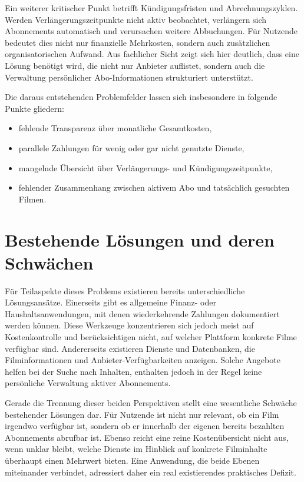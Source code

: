 Ein weiterer kritischer Punkt betrifft Kündigungsfristen und Abrechnungszyklen. Werden Verlängerungszeitpunkte nicht aktiv beobachtet, verlängern sich Abonnements automatisch und verursachen weitere Abbuchungen. Für Nutzende bedeutet dies nicht nur finanzielle Mehrkosten, sondern auch zusätzlichen organisatorischen Aufwand. Aus fachlicher Sicht zeigt sich hier deutlich, dass eine Lösung benötigt wird, die nicht nur Anbieter auflistet, sondern auch die Verwaltung persönlicher Abo-Informationen strukturiert unterstützt.

Die daraus entstehenden Problemfelder lassen sich insbesondere in folgende Punkte gliedern:
\begin{itemize}
    \item fehlende Transparenz über monatliche Gesamtkosten,
    \item parallele Zahlungen für wenig oder gar nicht genutzte Dienste,
    \item mangelnde Übersicht über Verlängerungs- und Kündigungszeitpunkte,
    \item fehlender Zusammenhang zwischen aktivem Abo und tatsächlich gesuchten Filmen.
\end{itemize}

\section{Bestehende Lösungen und deren Schwächen}
Für Teilaspekte dieses Problems existieren bereits unterschiedliche Lösungsansätze. Einerseits gibt es allgemeine Finanz- oder Haushaltsanwendungen, mit denen wiederkehrende Zahlungen dokumentiert werden können. Diese Werkzeuge konzentrieren sich jedoch meist auf Kostenkontrolle und berücksichtigen nicht, auf welcher Plattform konkrete Filme verfügbar sind. Andererseits existieren Dienste und Datenbanken, die Filminformationen und Anbieter-Verfügbarkeiten anzeigen. Solche Angebote helfen bei der Suche nach Inhalten, enthalten jedoch in der Regel keine persönliche Verwaltung aktiver Abonnements.

Gerade die Trennung dieser beiden Perspektiven stellt eine wesentliche Schwäche bestehender Lösungen dar. Für Nutzende ist nicht nur relevant, ob ein Film irgendwo verfügbar ist, sondern ob er innerhalb der eigenen bereits bezahlten Abonnements abrufbar ist. Ebenso reicht eine reine Kostenübersicht nicht aus, wenn unklar bleibt, welche Dienste im Hinblick auf konkrete Filminhalte überhaupt einen Mehrwert bieten. Eine Anwendung, die beide Ebenen miteinander verbindet, adressiert daher ein real existierendes praktisches Defizit.

